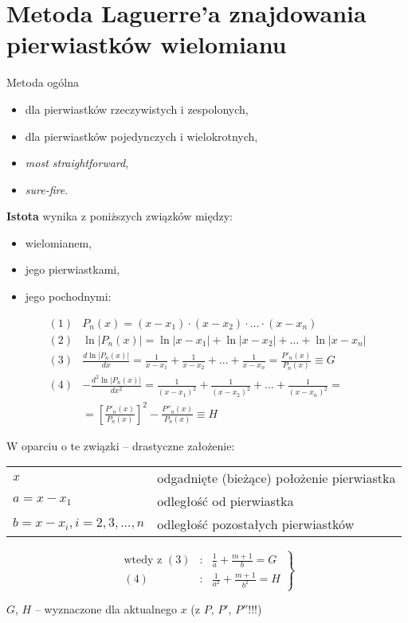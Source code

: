 \section{Metoda Laguerre'a znajdowania pierwiastków wielomianu}

\begin{frame}
  Metoda ogólna
  \begin{itemize}
    \item dla pierwiastków rzeczywistych i zespolonych,
    \item dla pierwiastków pojedynczych i wielokrotnych,
    \item \textit{most straightforward},
    \item \textit{sure-fire}.
  \end{itemize}
\end{frame}

\begin{frame}
  \textbf{Istota} wynika z poniższych związków między:
  \begin{itemize}
    \item wielomianem,
    \item jego pierwiastkami,
    \item jego pochodnymi:
  \end{itemize}

  $$ \begin{array}{ll}
  (1) & P_n(x) = (x - x_1) \cdot (x - x_2) \cdot \ldots \cdot (x - x_n) \\
  (2) & \ln|P_n(x)| = \ln|x - x_1| + \ln|x - x_2| + \ldots + \ln|x - x_n| \\
  (3) & \frac{d \ln|P_n(x)|}{dx} = \frac{1}{x - x_1} + \frac{1}{x - x_2} + \ldots + \frac{1}{x - x_n} = \frac{P'_n(x)}{P_n(x)} \equiv G \\
  (4) & -\frac{d^2 \ln|P_n(x)|}{dx^2} = \frac{1}{(x - x_1)^2} + \frac{1}{(x - x_2)^2} + \ldots + \frac{1}{(x - x_n)^2} = \\
  & = \left[ \frac{P'_n(x)}{P_n(x)} \right] ^2 - \frac{P''_n(x)}{P_n(x)} \equiv H
  \end{array} $$
\end{frame}

\begin{frame}
  W oparciu o te związki -- drastyczne założenie:
  \begin{tabular}{ll}
    $x$ & odgadnięte (bieżące) położenie pierwiastka \\
    $a = x - x_1$ & odległość od pierwiastka \\
    $b = x - x_i, i = 2,3, \dots , n$ & odległość pozostałych pierwiastków
  \end{tabular}

  $$ \left. \begin{array}{rcl}
    \text{wtedy z } (3) & : & \frac{1}{a} + \frac{m+1}{b} = G \\ %
    (4) & : & \frac{1}{a^2} + \frac{m+1}{b^2} = H
\end{array} \right\} $$

$G$, $H$ -- wyznaczone dla aktualnego $x$ (z $P$, $P'$, $P''$!!!)
\end{frame}

